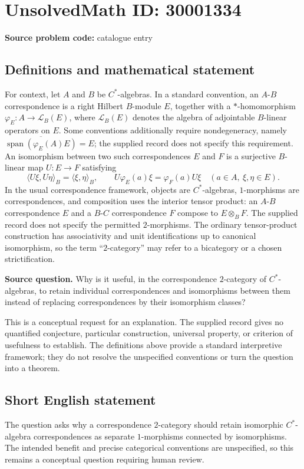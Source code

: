 \documentclass[11pt]{article}
\begin{document}
\section*{UnsolvedMath ID: 30001334}
\textbf{Source problem code:} catalogue entry
\subsection{Definitions and mathematical statement}
For context, let \(A\) and \(B\) be \(C^*\)-algebras. In a standard convention, an \(A\)-\(B\) correspondence is a right Hilbert \(B\)-module \(E\), together with a \(*\)-homomorphism \(\varphi_E\colon A\to\mathcal L_B(E)\), where \(\mathcal L_B(E)\) denotes the algebra of adjointable \(B\)-linear operators on \(E\). Some conventions additionally require nondegeneracy, namely \(\overline{\operatorname{span}(\varphi_E(A)E)}=E\); the supplied record does not specify this requirement. An isomorphism between two such correspondences \(E\) and \(F\) is a surjective \(B\)-linear map \(U\colon E\to F\) satisfying
\[
\langle U\xi,U\eta\rangle_B=\langle\xi,\eta\rangle_B,
\qquad
U\varphi_E(a)\xi=\varphi_F(a)U\xi
\quad(a\in A,\ \xi,\eta\in E).
\]
In the usual correspondence framework, objects are \(C^*\)-algebras, \(1\)-morphisms are correspondences, and composition uses the interior tensor product: an \(A\)-\(B\) correspondence \(E\) and a \(B\)-\(C\) correspondence \(F\) compose to \(E\otimes_B F\). The supplied record does not specify the permitted \(2\)-morphisms. The ordinary tensor-product construction has associativity and unit identifications up to canonical isomorphism, so the term ``\(2\)-category'' may refer to a bicategory or a chosen strictification.

\textbf{Source question.} Why is it useful, in the correspondence \(2\)-category of \(C^*\)-algebras, to retain individual correspondences and isomorphisms between them instead of replacing correspondences by their isomorphism classes?

This is a conceptual request for an explanation. The supplied record gives no quantified conjecture, particular construction, universal property, or criterion of usefulness to establish. The definitions above provide a standard interpretive framework; they do not resolve the unspecified conventions or turn the question into a theorem.
\subsection{Short English statement}
The question asks why a correspondence \(2\)-category should retain isomorphic \(C^*\)-algebra correspondences as separate \(1\)-morphisms connected by isomorphisms. The intended benefit and precise categorical conventions are unspecified, so this remains a conceptual question requiring human review.
\end{document}
